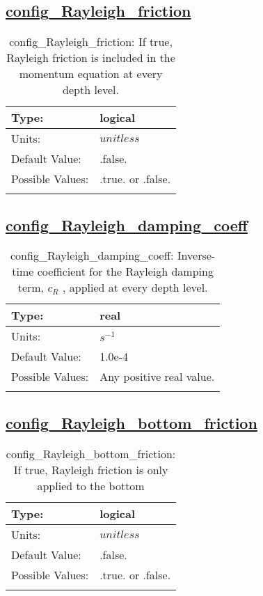 \subsection[config\_Rayleigh\_friction]{\hyperref[sec:nm_tab_Rayleigh_damping]{config\_Rayleigh\_friction}}
\label{subsec:nm_sec_config_Rayleigh_friction}
\begin{center}
\begin{longtable}{| p{2.0in} || p{4.0in} |}
    \hline
    Type: & logical \\
    \hline
    Units: & $unitless$ \\
    \hline
    Default Value: & .false. \\
    \hline
    Possible Values: & .true. or .false. \\
    \hline
    \caption{config\_Rayleigh\_friction: If true, Rayleigh friction is included in the momentum equation at every depth level.}
\end{longtable}
\end{center}
\subsection[config\_Rayleigh\_damping\_coeff]{\hyperref[sec:nm_tab_Rayleigh_damping]{config\_Rayleigh\_damping\_coeff}}
\label{subsec:nm_sec_config_Rayleigh_damping_coeff}
\begin{center}
\begin{longtable}{| p{2.0in} || p{4.0in} |}
    \hline
    Type: & real \\
    \hline
    Units: & $s^{-1}$ \\
    \hline
    Default Value: & 1.0e-4 \\
    \hline
    Possible Values: & Any positive real value. \\
    \hline
    \caption{config\_Rayleigh\_damping\_coeff:  Inverse-time coefficient for the Rayleigh damping term,  $c_R$ , applied at every depth level.}
\end{longtable}
\end{center}
\subsection[config\_Rayleigh\_bottom\_friction]{\hyperref[sec:nm_tab_Rayleigh_damping]{config\_Rayleigh\_bottom\_friction}}
\label{subsec:nm_sec_config_Rayleigh_bottom_friction}
\begin{center}
\begin{longtable}{| p{2.0in} || p{4.0in} |}
    \hline
    Type: & logical \\
    \hline
    Units: & $unitless$ \\
    \hline
    Default Value: & .false. \\
    \hline
    Possible Values: & .true. or .false. \\
    \hline
    \caption{config\_Rayleigh\_bottom\_friction: If true, Rayleigh friction is only applied to the bottom}
\end{longtable}
\end{center}
